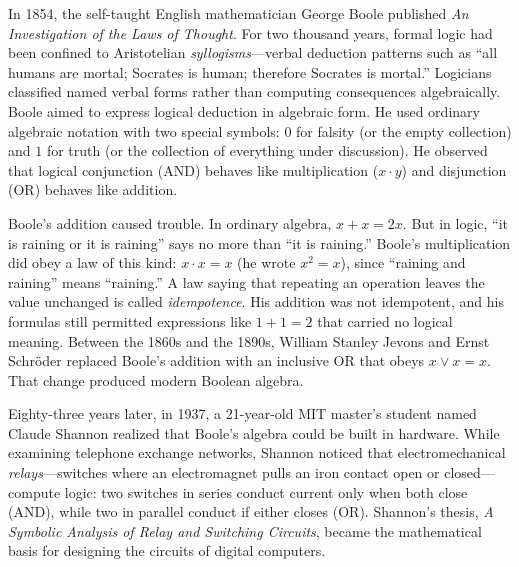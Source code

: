 \begin{historybox}
In 1854, the self-taught English mathematician George Boole published \emph{An Investigation of the Laws of Thought}. For two thousand years, formal logic had been confined to Aristotelian \emph{syllogisms}---verbal deduction patterns such as ``all humans are mortal; Socrates is human; therefore Socrates is mortal.'' Logicians classified named verbal forms rather than computing consequences algebraically. Boole aimed to express logical deduction in algebraic form. He used ordinary algebraic notation with two special symbols: $0$ for falsity (or the empty collection) and $1$ for truth (or the collection of everything under discussion). He observed that logical conjunction (AND) behaves like multiplication ($x \cdot y$) and disjunction (OR) behaves like addition.

Boole's addition caused trouble. In ordinary algebra, $x + x = 2x$. But in logic, ``it is raining or it is raining'' says no more than ``it is raining.'' Boole's multiplication did obey a law of this kind: $x \cdot x = x$ (he wrote $x^2 = x$), since ``raining and raining'' means ``raining.'' A law saying that repeating an operation leaves the value unchanged is called \emph{idempotence}. His addition was not idempotent, and his formulas still permitted expressions like $1 + 1 = 2$ that carried no logical meaning. Between the 1860s and the 1890s, William Stanley Jevons and Ernst Schr\"oder replaced Boole's addition with an inclusive OR that obeys $x \lor x = x$. That change produced modern Boolean algebra.

Eighty-three years later, in 1937, a 21-year-old MIT master's student named Claude Shannon realized that Boole's algebra could be built in hardware. While examining telephone exchange networks, Shannon noticed that electromechanical \emph{relays}---switches where an electromagnet pulls an iron contact open or closed---compute logic: two switches in series conduct current only when both close (AND), while two in parallel conduct if either closes (OR). Shannon's thesis, \emph{A Symbolic Analysis of Relay and Switching Circuits}, became the mathematical basis for designing the circuits of digital computers.


\end{historybox}
